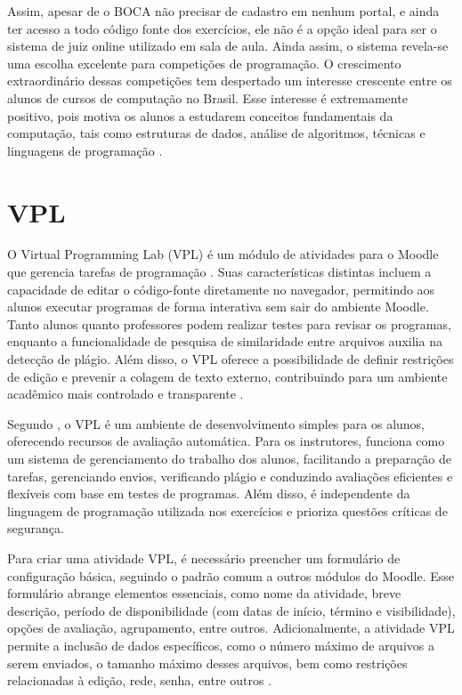 Assim, apesar de o BOCA não precisar de cadastro em nenhum portal, e ainda ter acesso a todo código fonte dos exercícios, ele não é a opção ideal para ser o sistema de juiz online utilizado em sala de aula. Ainda assim, o sistema revela-se uma escolha excelente para competições de programação. O crescimento extraordinário dessas competições tem despertado um interesse crescente entre os alunos de cursos de computação no Brasil. Esse interesse é extremamente positivo, pois motiva os alunos a estudarem conceitos fundamentais da computação, tais como estruturas de dados, análise de algoritmos, técnicas e linguagens de programação \cite[p.~11]{camposferreira}.

\section{VPL}

O Virtual Programming Lab (VPL) é um módulo de atividades para o Moodle que gerencia tarefas de programação \cite{vpl}. Suas características distintas incluem a capacidade de editar o código-fonte diretamente no navegador, permitindo aos alunos executar programas de forma interativa sem sair do ambiente Moodle. Tanto alunos quanto professores podem realizar testes para revisar os programas, enquanto a funcionalidade de pesquisa de similaridade entre arquivos auxilia na detecção de plágio. Além disso, o VPL oferece a possibilidade de definir restrições de edição e prevenir a colagem de texto externo, contribuindo para um ambiente acadêmico mais controlado e transparente \cite{vpl}.

Segundo \textcite[p.~1]{rodriguezdelpinoandroyo}, o VPL é um ambiente de desenvolvimento simples para os alunos, oferecendo recursos de avaliação automática. Para os instrutores, funciona como um sistema de gerenciamento do trabalho dos alunos, facilitando a preparação de tarefas, gerenciando envios, verificando plágio e conduzindo avaliações eficientes e flexíveis com base em testes de programas. Além disso, é independente da linguagem de programação utilizada nos exercícios e prioriza questões críticas de segurança.

Para criar uma atividade VPL, é necessário preencher um formulário de configuração básica, seguindo o padrão comum a outros módulos do Moodle. Esse formulário abrange elementos essenciais, como nome da atividade, breve descrição, período de disponibilidade (com datas de início, término e visibilidade), opções de avaliação, agrupamento, entre outros. Adicionalmente, a atividade VPL permite a inclusão de dados específicos, como o número máximo de arquivos a serem enviados, o tamanho máximo desses arquivos, bem como restrições relacionadas à edição, rede, senha, entre outros \cite{vpl}.

